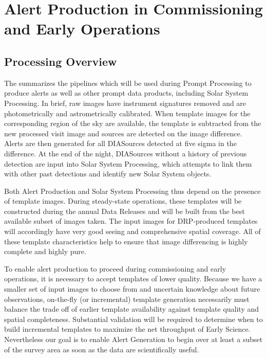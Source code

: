
%


\section{Alert Production in Commissioning and Early Operations}
\label{sec:pp}

\subsection{Processing Overview}

The \DPDD{} summarizes the pipelines which will be used during Prompt Processing to produce alerts as well as other prompt data products, including Solar System Processing.
In brief, raw images have instrument signatures removed and are photometrically and astrometrically calibrated.
When template images for the corresponding region of the sky are available, the template is subtracted from the new processed visit image and sources are detected on the image difference.
Alerts are then generated for all DIASources detected at five sigma in the difference.
At the end of the night, DIASources without a history of previous detection are input into Solar System Processing, which attempts to link them with other past detections and identify new Solar System objects.

Both Alert Production and Solar System Processing thus depend on the presence of template images.
During steady-state operations, these templates will be constructed during the annual Data Releases and will be built from the best available subset of images taken.
The input images for DRP-produced templates will accordingly have very good seeing and comprehensive spatial coverage.
All of these template characteristics help to ensure that image differencing is highly complete and highly pure.

To enable alert production to proceed during commissioning and early operations, it is necessary to accept templates of lower quality.
Because we have a smaller set of input images to choose from and uncertain knowledge about future observations, on-the-fly (or incremental) template generation necessarily must balance the trade off of earlier template availability against template quality and spatial completeness.
Substantial validation will be required to determine when to build incremental templates to maximize the net throughput of Early Science.
Nevertheless our goal is to enable Alert Generation to begin over at least a subset of the survey area as soon as the data are scientifically useful.

